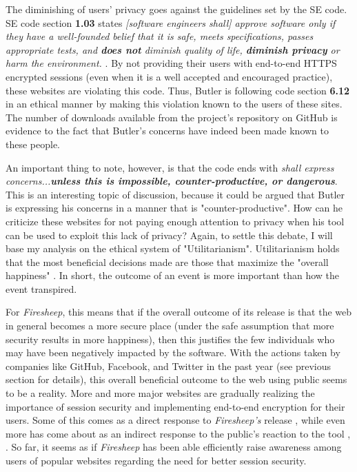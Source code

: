 \documentclass[11pt]{article}
\begin{document}
\begin{multicols}{2}
The diminishing of users' privacy goes against the guidelines set by the SE code. SE code section \textbf{1.03} states \emph{[software engineers shall] approve software only if they have a well-founded belief that it is safe, meets specifications, passes appropriate tests, and \textbf{does not} diminish quality of life, \textbf{diminish privacy} or harm the environment.} \cite{se_code}. By not providing their users with end-to-end HTTPS encrypted sessions (even when it is a well accepted and encouraged practice), these websites are violating this code. Thus, Butler is following code section \textbf{6.12} in an ethical manner by making this violation known to the users of these sites. The number of downloads available from the project's repository on GitHub \cite{github} is evidence to the fact that Butler's concerns have indeed been made known to these people.

An important thing to note, however, is that the code ends with \emph{shall express concerns...\textbf{unless this is impossible, counter-productive, or dangerous}}. This is an interesting topic of discussion, because it could be argued that Butler is expressing his concerns in a manner that is "counter-productive". How can he criticize these websites for not paying enough attention to privacy when his tool can be used to exploit this lack of privacy? Again, to settle this debate, I will base my analysis on the ethical system of "Utilitarianism". Utilitarianism holds that the most beneficial decisions made are those that maximize the "overall happiness" \cite{utility}. In short, the outcome of an event is more important than how the event transpired.

For \emph{Firesheep}, this means that if the overall outcome of its release is that the web in general becomes a more secure place (under the safe assumption that more security results in more happiness), then this justifies the few individuals who may have been negatively impacted by the software. With the actions taken by companies like GitHub, Facebook, and Twitter in the past year (see previous section for details), this overall beneficial outcome to the web using public seems to be a reality. More and more major websites are gradually realizing the importance of session security and implementing end-to-end encryption for their users. Some of this comes as a direct response to \emph{Firesheep's} release \cite{github_reaction}, while even more has come about as an indirect response to the public's reaction to the tool \cite{facebook_reaction}, \cite{twitter_reaction}. So far, it seems as if \emph{Firesheep} has been able efficiently raise awareness among users of popular websites regarding the need for better session security.


\end{multicols}
\end{document}
